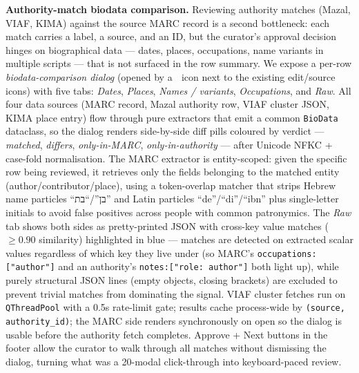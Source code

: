 \documentclass[Afour,sageh,times]{sagej}
\newcommand{\code}[1]{\texttt{#1}}
\begin{document}
\textbf{Authority-match biodata comparison.} Reviewing authority matches (Mazal, VIAF, KIMA) against the source MARC record is a second bottleneck: each match carries a label, a source, and an ID, but the curator's approval decision hinges on biographical data --- dates, places, occupations, name variants in multiple scripts --- that is not surfaced in the row summary. We expose a per-row \emph{biodata-comparison dialog} (opened by a \textbf{🧬} icon next to the existing edit/source icons) with five tabs: \emph{Dates}, \emph{Places}, \emph{Names / variants}, \emph{Occupations}, and \emph{Raw}. All four data sources (MARC record, Mazal authority row, VIAF cluster JSON, KIMA place entry) flow through pure extractors that emit a common \code{BioData} dataclass, so the dialog renders side-by-side diff pills coloured by verdict --- \emph{matched}, \emph{differs}, \emph{only-in-MARC}, \emph{only-in-authority} --- after Unicode NFKC + case-fold normalisation. The MARC extractor is entity-scoped: given the specific row being reviewed, it retrieves only the fields belonging to the matched entity (author/contributor/place), using a token-overlap matcher that strips Hebrew name particles ``בן''/``בת'' and Latin particles ``de''/``di''/``ibn'' plus single-letter initials to avoid false positives across people with common patronymics. The \emph{Raw} tab shows both sides as pretty-printed JSON with cross-key value matches ($\ge 0.90$ similarity) highlighted in blue --- matches are detected on extracted scalar values regardless of which key they live under (so MARC's \code{occupations:["author"]} and an authority's \code{notes:["role: author"]} both light up), while purely structural JSON lines (empty objects, closing brackets) are excluded to prevent trivial matches from dominating the signal. VIAF cluster fetches run on \code{QThreadPool} with a 0.5s rate-limit gate; results cache process-wide by \code{(source, authority\_id)}; the MARC side renders synchronously on open so the dialog is usable before the authority fetch completes. Approve + Next buttons in the footer allow the curator to walk through all matches without dismissing the dialog, turning what was a 20-modal click-through into keyboard-paced review.
\end{document}
